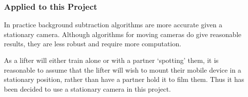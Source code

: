 \subsubsection{Applied to this Project}

In practice background subtraction algorithms are more accurate given a stationary camera. Although algorithms for moving cameras do give reasonable results, they are less robust and require more computation.

As a lifter will either train alone or with a partner `spotting' them, it is reasonable to assume that the lifter will wish to mount their mobile device in a stationary position, rather than have a partner hold it to film them. Thus it has been decided to use a stationary camera in this project. 